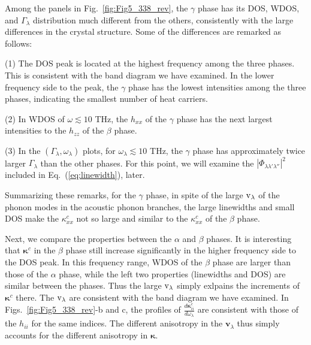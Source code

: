 \documentclass[twocolumn,amsmath,amssymb,a4paper,prb,superscriptaddress,floatfix]{revtex4-1}
\begin{document}
Among the panels in Fig.~\ref{fig:Fig5_338_rev}, the $\gamma$ phase has its DOS,
WDOS, and $\Gamma_\lambda$ distribution much different from the others,
consistently with the large differences in the crystal structure. Some of the
differences are remarked as follows:

(1) The DOS peak is located at the highest frequency among the three phases.
This is consistent with the band diagram we have examined. In
the lower frequency side to the peak, the $\gamma$ phase has the lowest intensities among
the three phases, indicating the smallest number of heat carriers. 

(2) In WDOS of $\omega \lesssim 10$ THz, the $h_{xx}$ of the $\gamma$ phase has
the next largest intensities to the $h_{zz}$ of the $\beta$ phase. 

(3) In the $(\Gamma_\lambda,\omega_\lambda)$ plots, for $\omega_\lambda \lesssim
10$
THz, the $\gamma$ phase has approximately twice larger $\Gamma_\lambda$ than the
other phases. 
For this point, we will examine the
$|\Phi_{\lambda\lambda'\lambda''}|^2$ included in Eq.~(\ref{eq:linewidth}),
later. 

Summarizing these remarks, for the $\gamma$ phase, in spite of the large
$\rm{v}_\lambda$ of the phonon modes in the acoustic phonon branches, the large
linewidths and small DOS make the $\kappa^c_{xx}$  not so large and similar to
the $\kappa^c_{xx}$ of the $\beta$ phase.

Next, we compare the properties between the $\alpha$ and $\beta$ phases.  It is
interesting that $\boldsymbol{\kappa}^c$ in the $\beta$ phase still increase
significantly in the higher frequency side to the DOS peak. In this frequency
range, WDOS of the $\beta$ phase are larger than those of the $\alpha$ phase,
while the left two properties (linewidths and DOS) are similar between the
phases. Thus the large $\rm{v}_\lambda$ simply exlpains the increments of
$\boldsymbol{\kappa}^c$ there. The $\rm{v}_\lambda$ are consistent with the band
diagram we have examined. In Figs.~\ref{fig:Fig5_338_rev}-b and c, the profiles
of $\frac{d\boldsymbol{\kappa}^c_{ii}}{d\omega_\lambda}$ are consistent with
those of the $h_{ii}$ for the same indices.  The different anisotropy in the
$\mathbf{v}_\lambda$ thus simply accounts for the different anisotropy in
$\boldsymbol{\kappa}$. 
\end{document}
